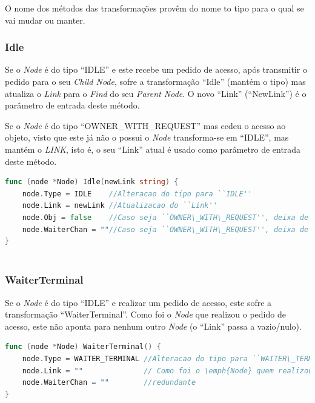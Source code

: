 O nome dos métodos das transformações provêm do nome to tipo 
para o qual se vai mudar ou manter.


\subsubsection*{Idle}
Se o \emph{Node} é do tipo ``IDLE'' e este recebe um pedido de acesso, após transmitir
o pedido para o seu \emph{Child Node}, sofre a transformação ``Idle'' (mantém o tipo) mas atualiza o \emph{Link} para o \emph{Find} do seu \emph{Parent Node}.
O novo ``Link'' (``NewLink'') é o parâmetro de entrada deste método.

Se o \emph{Node} é do tipo ``OWNER\_WITH\_REQUEST'' mas cedeu o acesso ao objeto, visto que este já não o possui o \emph{Node}
transforma-se em ``IDLE'', mas mantém o \emph{LINK}, isto é, o seu ``Link'' atual é usado como
parâmetro de entrada deste método.

\begin{lstlisting}[caption={Método/transformação ``Idle''},language=Go]
func (node *Node) Idle(newLink string) {
	node.Type = IDLE    //Alteracao do tipo para ``IDLE''
	node.Link = newLink //Atualizacao do ``Link''
	node.Obj = false    //Caso seja ``OWNER\_WITH\_REQUEST'', deixa de ter acesso ao obj
	node.WaiterChan = ""//Caso seja ``OWNER\_WITH\_REQUEST'', deixa de ter o ``Node'' em espera
}
	
\end{lstlisting}


\subsubsection*{WaiterTerminal}

Se o \emph{Node} é do tipo ``IDLE'' e realizar um pedido de acesso,
este sofre a transformação ``WaiterTerminal''.
Como foi o \emph{Node} que realizou o pedido de acesso, este não aponta para nenhum outro \emph{Node} (o ``Link'' passa a vazio/nulo).


\begin{lstlisting}[caption={Método/transformação ``WaiterTerminal''},language=Go]
func (node *Node) WaiterTerminal() {
	node.Type = WAITER_TERMINAL //Alteracao do tipo para ``WAITER\_TERMINAL''
	node.Link = ""       		// Como foi o \emph{Node} quem realizou o pedido, este nao aponta para nenhum outro \emph{Node}
	node.WaiterChan = "" 		//redundante
}
\end{lstlisting}



